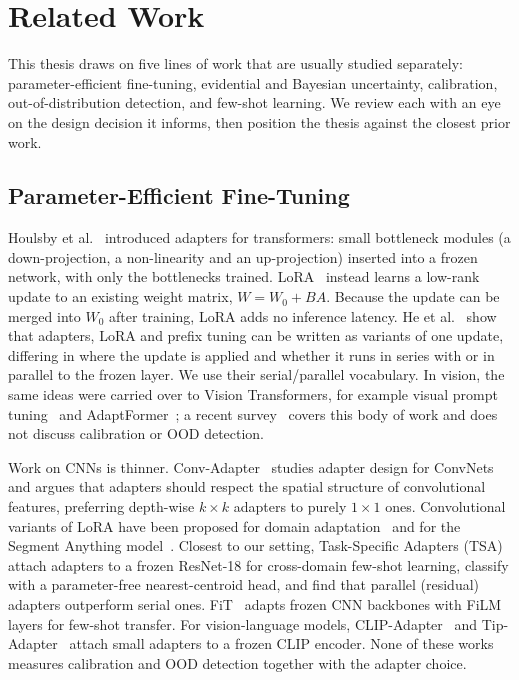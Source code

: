 \chapter{Related Work}
\label{ch:related}

This thesis draws on five lines of work that are usually studied separately: parameter-efficient
fine-tuning, evidential and Bayesian uncertainty, calibration, out-of-distribution detection, and
few-shot learning. We review each with an eye on the design decision it informs, then position the
thesis against the closest prior work.

\section{Parameter-Efficient Fine-Tuning}

Houlsby et al.~\cite{houlsby2019adapters} introduced adapters for transformers: small bottleneck modules
(a down-projection, a non-linearity and an up-projection) inserted into a frozen network, with only the
bottlenecks trained. LoRA~\cite{hu2022lora} instead learns a low-rank update to an existing weight
matrix, $W = W_0 + BA$. Because the update can be merged into $W_0$ after training, LoRA adds no
inference latency. He et al.~\cite{he2022unified} show that adapters, LoRA and prefix tuning can be
written as variants of one update, differing in where the update is applied and whether it runs in
series with or in parallel to the frozen layer. We use their serial/parallel vocabulary. In vision, the
same ideas were carried over to Vision Transformers, for example visual prompt tuning~\cite{jia2022vpt}
and AdaptFormer~\cite{chen2022adaptformer}; a recent survey~\cite{xin2024peftsurvey} covers this body of
work and does not discuss calibration or OOD detection.

Work on CNNs is thinner. Conv-Adapter~\cite{chen2024convadapter} studies adapter design for ConvNets
and argues that adapters should respect the spatial structure of convolutional features, preferring
depth-wise $k \times k$ adapters to purely $1 \times 1$ ones. Convolutional variants of LoRA have been
proposed for domain adaptation~\cite{aleem2024convlora} and for the Segment Anything
model~\cite{zhong2024convlora}. Closest to our setting, Task-Specific Adapters (TSA)~\cite{li2022tsa}
attach adapters to a frozen ResNet-18 for cross-domain few-shot learning, classify with a
parameter-free nearest-centroid head, and find that parallel (residual) adapters outperform serial ones.
FiT~\cite{shysheya2023fit} adapts frozen CNN backbones with FiLM layers for few-shot transfer. For
vision-language models, CLIP-Adapter~\cite{gao2024clipadapter} and Tip-Adapter~\cite{zhang2022tipadapter}
attach small adapters to a frozen CLIP encoder. None of these works measures calibration and OOD
detection together with the adapter choice.

